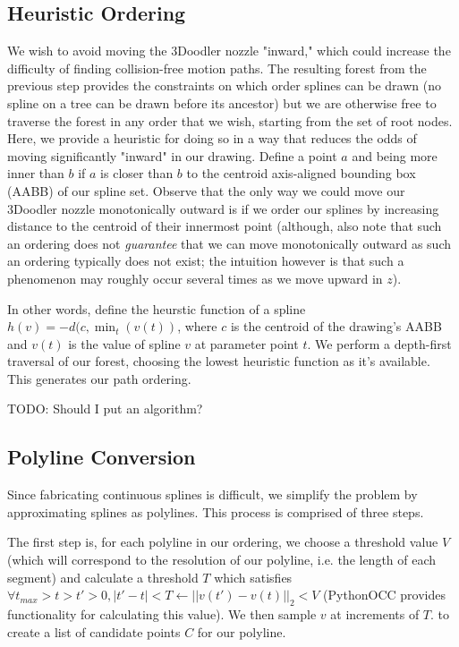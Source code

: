 \documentclass[conference]{acmsiggraph}
\begin{document}
\subsection{Heuristic Ordering}
We wish to avoid moving the 3Doodler nozzle "inward," which could increase the difficulty of finding collision-free motion paths.  The resulting forest from the previous step provides the constraints on which order splines can be drawn (no spline on a tree can be drawn before its ancestor) but we are otherwise free to traverse the forest in any order that we wish, starting from the set of root nodes.  Here, we provide a heuristic for doing so in a way that reduces the odds of moving significantly "inward" in our drawing.  Define a point $a$ and being more inner than $b$ if $a$ is closer than $b$ to the centroid axis-aligned bounding box (AABB) of our spline set.  Observe that the only way we could move our 3Doodler nozzle monotonically outward is if we order our splines by increasing distance to the centroid of their innermost point (although, also note that such an ordering does not \emph{guarantee} that we can move monotonically outward as such an ordering typically does not exist; the intuition however is that such a phenomenon may roughly occur several times as we move upward in $z$).

In other words, define the heurstic function of a spline $h(v) = -d(c, \min_t(v(t))$, where $c$ is the centroid of the drawing's AABB and $v(t)$ is the value of spline $v$ at parameter point $t$.  We perform a depth-first traversal of our forest, choosing the lowest heuristic function as it's available.  This generates our path ordering.

TODO: Should I put an algorithm?


\subsection{Polyline Conversion}
Since fabricating continuous splines is difficult, we simplify the problem by approximating splines as polylines.  This process is comprised of three steps.

The first step is, for each polyline in our ordering, we choose a threshold value $V$ (which will correspond to the resolution of our polyline, i.e. the length of each segment) and calculate a threshold $T$ which satisfies $\forall t_{max} > t > t' > 0, |t' - t| < T \leftarrow ||v(t') - v(t)||_2 < V$ (PythonOCC provides functionality for calculating this value).  We then sample $v$ at increments of $T$. to create a list of candidate points $C$ for our polyline.  
\end{document}
